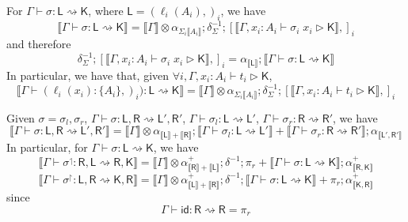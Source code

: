 \documentclass[acmsmall,screen,review]{acmart}
\newcommand{\ms}[1]{\ensuremath{\mathsf{#1}}}
\newcommand{\lto}{:}
\newcommand{\wbranch}[3]{#1(#2) \lto \{#3\}}
\newcommand{\rupg}[1]{{#1}^\upharpoonright}
\newcommand{\lupg}[1]{{#1}^\upharpoonleft}
\newcommand{\bhyp}[2]{#1 : #2}
\newcommand{\haslb}[3]{#1 \vdash #2 \rhd #3}
\newcommand{\lbsubst}[4]{#1 \vdash #2: #3 \rightsquigarrow #4}
\newcommand{\dnt}[1]{\llbracket{#1}\rrbracket}
\begin{document}
\begin{lemma}
  For $\lbsubst{\Gamma}{\sigma}{\ms{L}}{\ms{K}}$, where $\ms{L} = (\ell_i(A_i),)_i$, we have
  \begin{equation}
    \dnt{\lbsubst{\Gamma}{\sigma}{\ms{L}}{\ms{K}}} 
    = \dnt{\Gamma} \otimes \alpha_{\Sigma_i\dnt{A_i}} 
    ; \delta^{-1}_{\Sigma}
    ; [\dnt{\haslb{\Gamma, \bhyp{x_i}{A_i}}{\sigma_i\;x_i}{\ms{K}}},]_i
  \end{equation}
  and therefore
  \begin{equation}
    \delta^{-1}_{\Sigma}
    ; [\dnt{\haslb{\Gamma, \bhyp{x_i}{A_i}}{\sigma_i\;x_i}{\ms{K}}},]_i
    = \alpha_{\dnt{\ms{L}}}
    ; \dnt{\lbsubst{\Gamma}{\sigma}{\ms{L}}{\ms{K}}} 
  \end{equation}
  In particular, we have that, given $\forall i, \haslb{\Gamma, \bhyp{x_i}{A_i}}{t_i}{\ms{K}}$,
  \begin{equation}
    \dnt{\lbsubst{\Gamma}{(\wbranch{\ell_i}{x_i}{A_i},)_i)}{\ms{L}}{\ms{K}}}
    = \dnt{\Gamma} \otimes \alpha_{\Sigma_i\dnt{A_i}} 
    ; \delta^{-1}_{\Sigma}
    ; [\dnt{\haslb{\Gamma, \bhyp{x_i}{A_i}}{t_i}{\ms{K}}},]_i
  \end{equation}
  \label{lem:lsubst-distrib}
\end{lemma}

\begin{lemma}
  Given $\sigma = \sigma_l, \sigma_r$,
    $\lbsubst{\Gamma}{\sigma}{\ms{L}, \ms{R}}{\ms{L}', \ms{R}'}$,
    $\lbsubst{\Gamma}{\sigma_l}{\ms{L}}{\ms{L}'}$,
    $\lbsubst{\Gamma}{\sigma_r}{\ms{R}}{\ms{R}'}$, we have
  \begin{equation}
    \dnt{\lbsubst{\Gamma}{\sigma}{\ms{L}, \ms{R}}{\ms{L}', \ms{R}'}}
    = \dnt{\Gamma} \otimes \alpha_{\dnt{\ms{L}} + \dnt{\ms{R}}} 
    ; \dnt{\lbsubst{\Gamma}{\sigma_l}{\ms{L}}{\ms{L}'}} 
    + \dnt{\lbsubst{\Gamma}{\sigma_r}{\ms{R}}{\ms{R}'}}
    ; \alpha_{\dnt{\ms{L}', \ms{R}'}}
  \end{equation}
  In particular, for $\lbsubst{\Gamma}{\sigma}{\ms{L}}{\ms{K}}$, we have
  \begin{equation}
    \dnt{\lbsubst{\Gamma}{\lupg{\sigma}}{\ms{R}, \ms{L}}{\ms{R}, \ms{K}}}
    = \dnt{\Gamma} \otimes \alpha^+_{\dnt{\ms{R}} + \dnt{\ms{L}}} 
      ; \delta^{-1} 
      ; \pi_r + \dnt{\lbsubst{\Gamma}{\sigma}{\ms{L}}{\ms{K}}}
      ; \alpha^+_{\dnt{\ms{R}, \ms{K}}}
  \end{equation}
  \begin{equation}
    \dnt{\lbsubst{\Gamma}{\rupg{\sigma}}{\ms{L}, \ms{R}}{\ms{K}, \ms{R}}}
    = \dnt{\Gamma} \otimes \alpha^+_{\dnt{\ms{L}} + \dnt{\ms{R}}} 
      ; \delta^{-1} 
      ; \dnt{\lbsubst{\Gamma}{\sigma}{\ms{L}}{\ms{K}}} + \pi_r
      ; \alpha^+_{\dnt{\ms{K}, \ms{R}}}
  \end{equation}
  since
  \begin{equation}
    \lbsubst{\Gamma}{\ms{id}}{\ms{R}}{\ms{R}} = \pi_r
  \end{equation}
\end{lemma}
\end{document}
